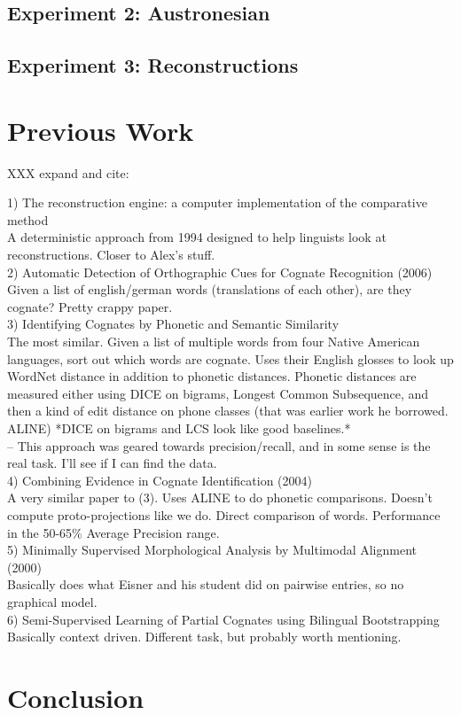 \documentclass[11pt,a4paper]{article}
\begin{document}
\subsection{Experiment 2: Austronesian}

\subsection{Experiment 3: Reconstructions}


\section{Previous Work}
XXX expand and cite:

1) The reconstruction engine: a computer implementation of the
comparative method\\
  A deterministic approach from 1994 designed to help linguists look
at reconstructions. Closer to Alex's stuff. \\
2) Automatic Detection of Orthographic Cues for Cognate Recognition (2006) \\
  Given a list of english/german words (translations of each other),
are they cognate? Pretty crappy paper.\\
3) Identifying Cognates by Phonetic and Semantic Similarity \\
  The most similar. Given a list of multiple words from four Native
American languages, sort out which words are cognate. Uses their
English glosses to look up WordNet distance in addition to phonetic
distances. Phonetic distances are measured either using DICE on
bigrams, Longest Common Subsequence, and then a kind of edit distance
on phone classes (that was earlier work he borrowed. ALINE) *DICE on
bigrams and LCS look like good baselines.*\\
  -- This approach was geared towards precision/recall, and in some
sense is the real task. I'll see if I can find the data. \\
4)  Combining Evidence in Cognate Identification (2004) \\
  A very similar paper to (3). Uses ALINE to do phonetic comparisons.
Doesn't compute proto-projections like we do. Direct comparison of
words. Performance in the 50-65\% Average Precision range.\\
5) Minimally Supervised Morphological Analysis by Multimodal Alignment (2000) \\
  Basically does what Eisner and his student did on pairwise entries,
so no graphical model.\\
6) Semi-Supervised Learning of Partial Cognates using Bilingual Bootstrapping
  Basically context driven. Different task, but probably worth mentioning.

\section{Conclusion}
\end{document}
